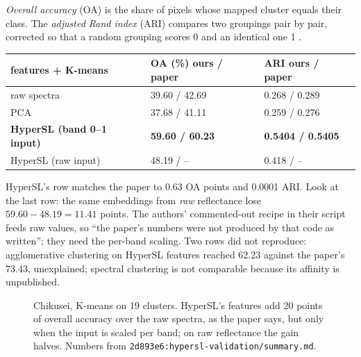 \begin{definition}
\emph{Overall accuracy} (OA) is the share of pixels whose mapped cluster equals their class.
The \emph{adjusted Rand index} (ARI) compares two groupings pair by pair, corrected so that a
random grouping scores 0 and an identical one 1 \citep{hubert1985comparing}.
\end{definition}

\begin{center}\small
\begin{tabular}{@{}lll@{}}
\toprule
features + K-means & OA (\%) ours / paper & ARI ours / paper \\
\midrule
raw spectra & 39.60 / 42.69 & 0.268 / 0.289 \\
PCA & 37.68 / 41.11 & 0.259 / 0.276 \\
\textbf{HyperSL (band 0--1 input)} & \textbf{59.60 / 60.23} & \textbf{0.5404 / 0.5405} \\
HyperSL (raw input) & 48.19 / -- & 0.418 / -- \\
\bottomrule
\end{tabular}
\end{center}
HyperSL's row matches the paper to 0.63 OA points and 0.0001 ARI\tagC. Look at the last row: the same embeddings from
\emph{raw} reflectance lose $59.60-48.19=11.41$ points\tagC. The authors' commented-out recipe in their script feeds
raw values, so ``the paper's numbers were not produced by that code as written''; they need the per-band scaling.
Two rows did not reproduce: agglomerative clustering on HyperSL features reached 62.23 against the paper's 73.43,
unexplained; spectral clustering is not comparable because its affinity is unpublished.

\begin{figure}[htbp]
\centering
{}
\caption[Chikusei clustering: HyperSL features against raw spectra and PCA]{Chikusei, K-means on 19 clusters.
HyperSL's features add 20 points of overall accuracy over the raw spectra, as the paper says, but only when the input is
scaled per band; on raw reflectance the gain halves. Numbers from
\texttt{2d893e6:\allowbreak hypersl-validation/\allowbreak summary.md}.}
\label{fig:hslwhat:chikusei}
\end{figure}

